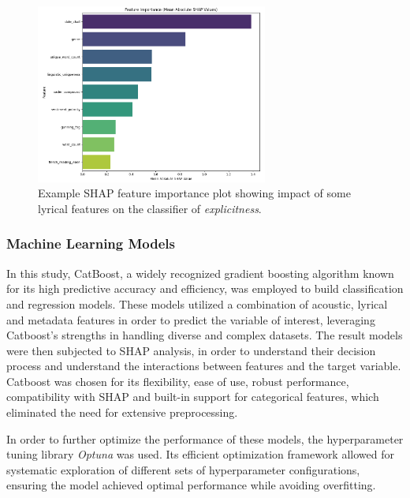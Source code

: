 \begin{center}
\begin{figure}[H]
  \centering
  \includegraphics[width=3in]{img/shap_feature_importance.png}
  \caption{Example SHAP feature importance plot showing impact of some lyrical features
  on the classifier of \textit{explicitness}.}
  \label{Figure:fig_beh}
\end{figure}
\end{center}

\subsubsection*{Machine Learning Models}
In this study, CatBoost\cite{catboost}, a widely recognized gradient boosting
algorithm known for its high predictive accuracy and efficiency, was employed
to build classification and regression models. These models utilized a
combination of acoustic, lyrical and metadata features in order to predict the
variable of interest, leveraging Catboost's strengths in handling diverse and
complex datasets. The result models were then subjected to SHAP analysis, in
order to understand their decision process and understand the interactions
between features and the target variable. Catboost was chosen for its
flexibility, ease of use, robust performance, compatibility with SHAP and
built-in support for categorical features,  which eliminated the need for
extensive preprocessing.

In order to further optimize the performance of these models, the
hyperparameter tuning library \textit{Optuna}\cite{optuna} was used. Its
efficient optimization framework allowed for systematic exploration of
different sets of hyperparameter configurations, ensuring the model achieved
optimal performance while avoiding overfitting. 

